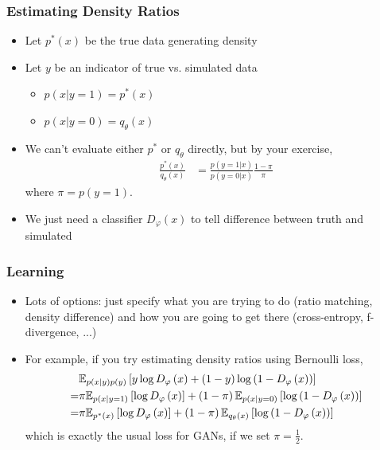 \documentclass[10pt,mathserif]{beamer}
\begin{document}
\begin{frame}
  \frametitle{Estimating Density Ratios}
 \begin{itemize}
 \item Let $p^{\ast}\left(x\right)$ be the true data generating density
 \item Let $y$ be an indicator of true vs. simulated data
   \begin{itemize}
   \item $p\left(x \vert y = 1\right) = p^{\ast}\left(x\right)$
   \item $p\left(x \vert y = 0\right) = q_{\theta}\left(x\right)$
   \end{itemize}
 \item We can't evaluate either $p^\ast$ or $q_{\theta}$ directly, but by your exercise,
   \begin{align*}
     \frac{p^{\ast}\left(x\right)}{q_{\theta}\left(x\right)} &= \frac{p\left(y = 1 \vert x\right)}{p\left(y = 0 \vert x\right)} \frac{1 - \pi}{\pi}
   \end{align*}
   where $\pi = p\left(y = 1\right)$.
   \item We just need a classifier $D_{\varphi}\left(x\right)$ to tell difference between
     truth and simulated
 \end{itemize}
\end{frame}

\begin{frame}
  \frametitle{Learning}
 \begin{itemize}
 \item Lots of options: just specify what you are trying to do (ratio matching,
   density difference) and how you are going to get there (cross-entropy,
   f-divergence, ...)
 \item For example, if you try estimating density ratios using Bernoulli loss,
   \begin{align*}
     &\mathbb{E}_{p\left(x \vert y\right)p\left(y\right)}\left[{y \log D_{\varphi}\left(x\right) + \left(1 - y\right)\log \left(1 - D_{\varphi}\left(x\right)\right)}\right] \\
      = & \pi \mathbb{E}_{p\left(x \vert y = 1\right)}\left[{\log D_{\varphi}\left(x\right)}\right] + \left(1 - \pi\right)\mathbb{E}_{p\left(x \vert y = 0\right)}\left[{\log \left(1 - D_{\varphi}\left(x\right)\right)}\right] \\
     = & \pi \mathbb{E}_{p^{\ast}\left(x\right)}\left[{\log D_{\varphi}\left(x\right)}\right] + \left(1 - \pi\right)\mathbb{E}_{q_{\theta}\left(x\right)}\left[{\log \left(1 - D_{\varphi}\left(x\right)\right)}\right]
   \end{align*}
  which is exactly the usual loss for GANs, if we set $\pi = \frac{1}{2}$.
 \end{itemize}
\end{frame}
\end{document}
